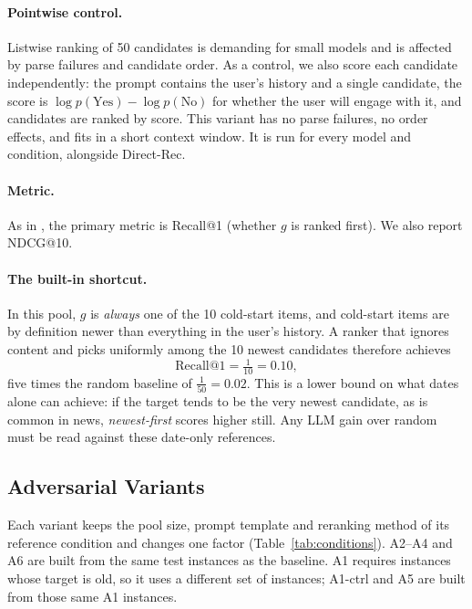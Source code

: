 \documentclass[11pt]{article}
\begin{document}
\paragraph{Pointwise control.} Listwise ranking of 50 candidates is demanding for small models and is affected by parse failures and candidate order. As a control, we also score each candidate independently: the prompt contains the user's history and a single candidate, the score is $\log p(\text{Yes}) - \log p(\text{No})$ for whether the user will engage with it, and candidates are ranked by score. This variant has no parse failures, no order effects, and fits in a short context window. It is run for every model and condition, alongside Direct-Rec.

\paragraph{Metric.} As in \citet{li2026llmreasoning}, the primary metric is Recall@1 (whether $g$ is ranked first). We also report NDCG@10.

\paragraph{The built-in shortcut.} In this pool, $g$ is \emph{always} one of the 10 cold-start items, and cold-start items are by definition newer than everything in the user's history. A ranker that ignores content and picks uniformly among the 10 newest candidates therefore achieves
\begin{equation}
  \text{Recall@1} = \tfrac{1}{10} = 0.10,
\end{equation}
five times the random baseline of $\tfrac{1}{50} = 0.02$. This is a lower bound on what dates alone can achieve: if the target tends to be the very newest candidate, as is common in news, \emph{newest-first} scores higher still. Any LLM gain over random must be read against these date-only references.

\subsection{Adversarial Variants}\label{sec:adv}

Each variant keeps the pool size, prompt template and reranking method of its reference condition and changes one factor (Table~\ref{tab:conditions}). A2--A4 and A6 are built from the same test instances as the baseline. A1 requires instances whose target is old, so it uses a different set of instances; A1-ctrl and A5 are built from those same A1 instances.
\end{document}
